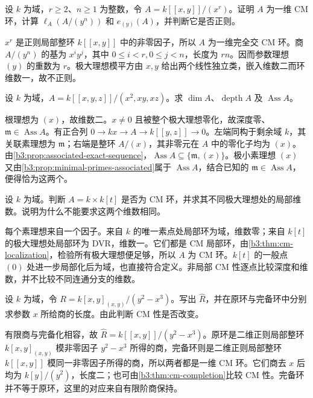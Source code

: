 \begin{exercise}\label{b3:ex:19-thickened-line}
	设 \(k\) 为域，\(r\ge2\)、\(n\ge1\) 为整数，令 \(A=k[\![x,y]\!]/(x^r)\)。证明 \(A\) 为一维 CM 环，计算 \(\ell_A(A/(y^n))\) 和 \(e_{(y)}(A)\)，并判断它是否正则。
\end{exercise}
\begin{solution}
	\(x^r\) 是正则局部整环 \(k[\![x,y]\!]\) 中的非零因子，所以 \(A\) 为一维完全交 CM 环。商 \(A/(y^n)\) 的基为 \(x^iy^j\)，其中 \(0\le i<r,0\le j<n\)，长度为 \(rn\)。因而参数理想 \((y)\) 的重数为 \(r\)。极大理想模平方由 \(x,y\) 给出两个线性独立类，嵌入维数二而环维数一，故不正则。
\end{solution}

\begin{exercise}\label{b3:ex:19-embedded-point-dimension-two}
	设 \(k\) 为域，\(A=k[\![x,y,z]\!]/(x^2,xy,xz)\)。求 \(\dim A\)、\(\operatorname{depth}A\) 及 \(\operatorname{Ass}A\)。
\end{exercise}
\begin{solution}
	根理想为 \((x)\)，故维数二。\(x\ne0\) 且被整个极大理想零化，故深度零、\(\mathfrak m\in\operatorname{Ass}A\)。有正合列 \(0\to kx\to A\to k[\![y,z]\!]\to0\)。左端同构于剩余域 \(k\)，其关联素理想为 \(\mathfrak m\)；右端是整环 \(A/(x)\)，其非零元在 \(A\) 中的零化子均为 \((x)\)。由\cref{b3:prop:associated-exact-sequence}，\(\operatorname{Ass}A\subseteq\{\mathfrak m,(x)\}\)。极小素理想 \((x)\) 又由\cref{b3:prop:minimal-primes-associated}属于 \(\operatorname{Ass}A\)，结合已知的 \(\mathfrak m\in\operatorname{Ass}A\)，便得恰为这两个。
\end{solution}

\begin{exercise}\label{b3:ex:19-product-cm}
	设 \(k\) 为域。判断 \(A=k\times k[t]\) 是否为 CM 环，并求其不同极大理想处的局部维数。说明为什么不能要求这两个维数相同。
\end{exercise}
\begin{solution}
	每个素理想来自一个因子。来自 \(k\) 的唯一素点处局部环为域，维数零；来自 \(k[t]\) 的极大理想处局部环为 DVR，维数一。它们都是 CM 局部环，由\cref{b3:thm:cm-localization}，检验所有极大理想便足够，所以 \(A\) 为 CM 环。\(k[t]\) 的一般点 \((0)\) 处进一步局部化后为域，也直接符合定义。非局部 CM 性逐点比较深度和维数，并不比较不同连通分支的维数。
\end{solution}

\begin{exercise}\label{b3:ex:19-completion-cusp}
	设 \(k\) 为域，令 \(R=k[x,y]_{(x,y)}/(y^2-x^3)\)。写出 \(\widehat R\)，并在原环与完备环中分别求参数 \(x\) 所给商的长度。由此判断 CM 性是否改变。
\end{exercise}
\begin{solution}
	有限商与完备化相容，故 \(\widehat R=k[\![x,y]\!]/(y^2-x^3)\)。原环是二维正则局部整环 \(k[x,y]_{(x,y)}\) 模非零因子 \(y^2-x^3\) 所得的商，完备环则是二维正则局部整环 \(k[\![x,y]\!]\) 模同一非零因子所得的商，所以两者都是一维 CM 环。它们商去 \(x\) 后均为 \(k[y]/(y^2)\)，长度二；也可由\cref{b3:thm:cm-completion}比较 CM 性。完备环并不等于原环，这里的对应来自有限阶商保持。
\end{solution}

